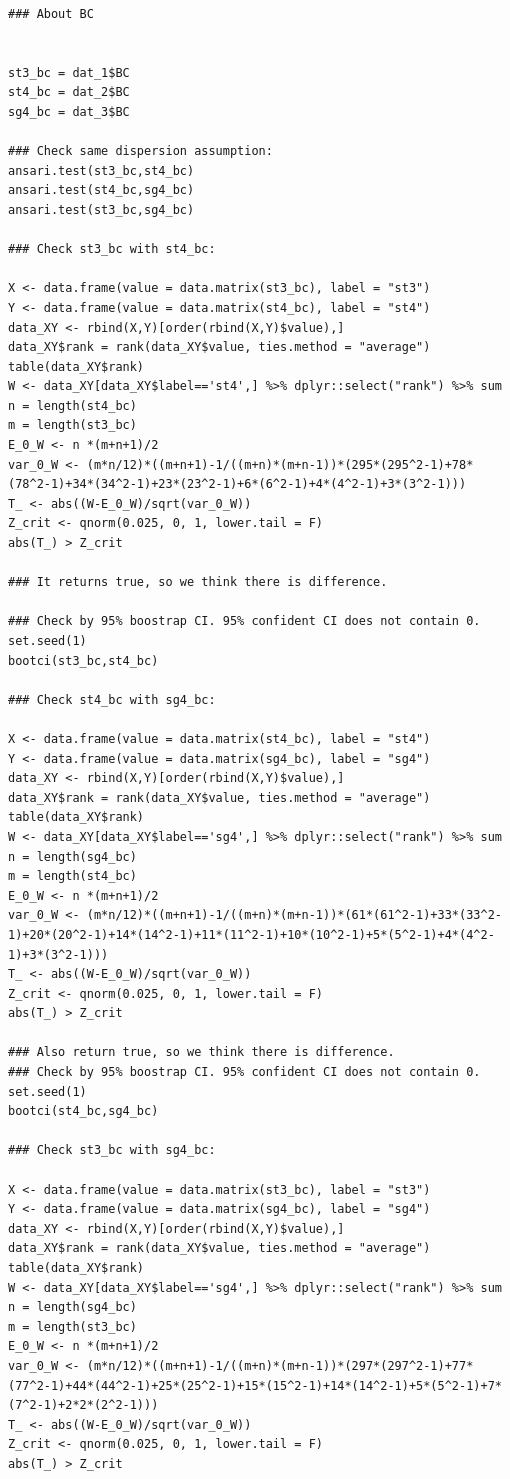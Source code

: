 \documentclass[11pt]{scrartcl} %
\begin{document}
\begin{lstlisting}
### About BC


st3_bc = dat_1$BC
st4_bc = dat_2$BC
sg4_bc = dat_3$BC

### Check same dispersion assumption:
ansari.test(st3_bc,st4_bc)
ansari.test(st4_bc,sg4_bc)
ansari.test(st3_bc,sg4_bc)

### Check st3_bc with st4_bc:

X <- data.frame(value = data.matrix(st3_bc), label = "st3")
Y <- data.frame(value = data.matrix(st4_bc), label = "st4")
data_XY <- rbind(X,Y)[order(rbind(X,Y)$value),]
data_XY$rank = rank(data_XY$value, ties.method = "average")
table(data_XY$rank)
W <- data_XY[data_XY$label=='st4',] %>% dplyr::select("rank") %>% sum
n = length(st4_bc)
m = length(st3_bc)
E_0_W <- n *(m+n+1)/2
var_0_W <- (m*n/12)*((m+n+1)-1/((m+n)*(m+n-1))*(295*(295^2-1)+78*(78^2-1)+34*(34^2-1)+23*(23^2-1)+6*(6^2-1)+4*(4^2-1)+3*(3^2-1)))
T_ <- abs((W-E_0_W)/sqrt(var_0_W))
Z_crit <- qnorm(0.025, 0, 1, lower.tail = F)
abs(T_) > Z_crit

### It returns true, so we think there is difference.

### Check by 95% boostrap CI. 95% confident CI does not contain 0.
set.seed(1)
bootci(st3_bc,st4_bc)

### Check st4_bc with sg4_bc:

X <- data.frame(value = data.matrix(st4_bc), label = "st4")
Y <- data.frame(value = data.matrix(sg4_bc), label = "sg4")
data_XY <- rbind(X,Y)[order(rbind(X,Y)$value),]
data_XY$rank = rank(data_XY$value, ties.method = "average")
table(data_XY$rank)
W <- data_XY[data_XY$label=='sg4',] %>% dplyr::select("rank") %>% sum
n = length(sg4_bc)
m = length(st4_bc)
E_0_W <- n *(m+n+1)/2
var_0_W <- (m*n/12)*((m+n+1)-1/((m+n)*(m+n-1))*(61*(61^2-1)+33*(33^2-1)+20*(20^2-1)+14*(14^2-1)+11*(11^2-1)+10*(10^2-1)+5*(5^2-1)+4*(4^2-1)+3*(3^2-1)))
T_ <- abs((W-E_0_W)/sqrt(var_0_W))
Z_crit <- qnorm(0.025, 0, 1, lower.tail = F)
abs(T_) > Z_crit

### Also return true, so we think there is difference.
### Check by 95% boostrap CI. 95% confident CI does not contain 0.
set.seed(1)
bootci(st4_bc,sg4_bc)

### Check st3_bc with sg4_bc:

X <- data.frame(value = data.matrix(st3_bc), label = "st3")
Y <- data.frame(value = data.matrix(sg4_bc), label = "sg4")
data_XY <- rbind(X,Y)[order(rbind(X,Y)$value),]
data_XY$rank = rank(data_XY$value, ties.method = "average")
table(data_XY$rank)
W <- data_XY[data_XY$label=='sg4',] %>% dplyr::select("rank") %>% sum
n = length(sg4_bc)
m = length(st3_bc)
E_0_W <- n *(m+n+1)/2
var_0_W <- (m*n/12)*((m+n+1)-1/((m+n)*(m+n-1))*(297*(297^2-1)+77*(77^2-1)+44*(44^2-1)+25*(25^2-1)+15*(15^2-1)+14*(14^2-1)+5*(5^2-1)+7*(7^2-1)+2*2*(2^2-1)))
T_ <- abs((W-E_0_W)/sqrt(var_0_W))
Z_crit <- qnorm(0.025, 0, 1, lower.tail = F)
abs(T_) > Z_crit


\end{lstlisting}
\end{document}
